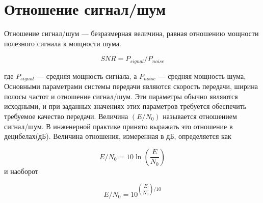 \section{Отношение сигнал/шум}
Отношение сигнал/шум --- безразмерная величина, равная отношению мощности полезного сигнала к мощности шума.

\[ SNR=P_{signal}/P_{noise} \]

где $P_{signal}$ --- средняя мощность сигнала, а $P_{noise}$ --- средняя мощность шума,
Основными параметрами системы передачи являются скорость передачи, ширина полосы частот и отношение сигнал/шум. Эти параметры обычно являются исходными, и при заданных значениях этих параметров требуется обеспечить требуемое качество передачи.
Величина $(E/N_0)$ называется отношением сигнал/шум.  В инженерной практике принято выражать это отношение в децибелах(дБ).  Величина отношения, измеренная в дБ, определяется как

\[E/N_0=10\ln{(\dfrac{E}{N_{0}})}\]
и наоборот

\[E/N_0=10^{(\dfrac{E}{N_{0}})/10}\]   
